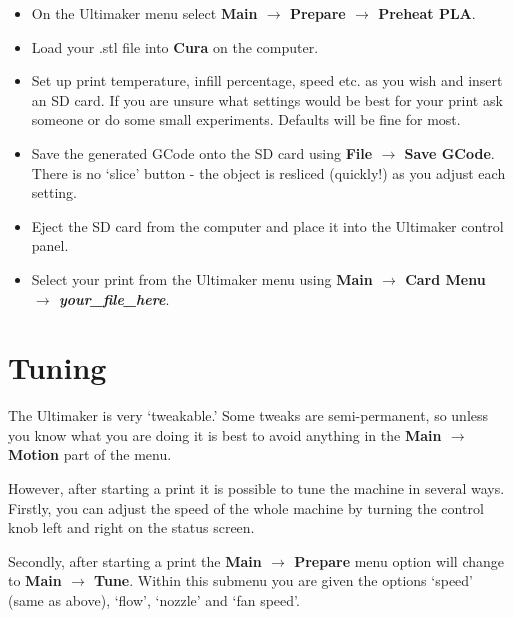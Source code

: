 \documentclass[a4paper,12pt]{article}
\begin{document}
\begin{itemize}
  \item On the Ultimaker menu select \textbf{Main $\rightarrow$ Prepare $\rightarrow$ Preheat PLA}.
  \item Load your .stl file into \textbf{Cura} on the computer.
  \item Set up print temperature, infill percentage, speed etc. as you wish and insert an SD card. If you are unsure what
  settings would be best for your print ask someone or do some small experiments. Defaults will be fine for most.
  \item Save the generated GCode onto the SD card using \textbf{File $\rightarrow$ Save GCode}. There is no `slice' button - the object is resliced (quickly!) as you adjust each setting.
  \item Eject the SD card from the computer and place it into the Ultimaker control panel.
  \item Select your print from the Ultimaker menu using \textbf{Main $\rightarrow$ Card Menu $\rightarrow$ \textit{your\_file\_here}}.
  
\end{itemize}

\section*{Tuning}
The Ultimaker is very `tweakable.' Some tweaks are semi-permanent, so unless you know what you are doing it is best to avoid anything in
the \textbf{Main $\rightarrow$ Motion} part of the menu.


However, after starting a print it is possible to tune the machine in several ways. Firstly, you can adjust the speed of the whole machine by turning the control knob left and right on the status screen. 

Secondly, after starting a print the \textbf{Main $\rightarrow$ Prepare} menu option will change to \textbf{Main $\rightarrow$ Tune}. Within this submenu you are given the options `speed' (same as above), `flow', `nozzle' and `fan speed'.
\end{document}
